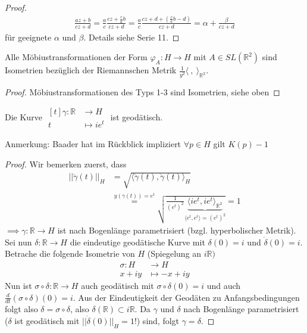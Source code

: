 \documentclass[../main.tex]{subfiles}
\begin{document}
\begin{proof}
    \begin{align*}
        \frac{az +b}{cz+d} =\frac{a}{c} \frac{cz+\frac{c}{a}b}{cz +d}=\frac{a}{c}\frac{cz+d+(\frac{c}{a}b-d)}{cz+d}
        = \alpha + \frac{\beta}{cz+d}
    \end{align*} für geeignete $\alpha$ und $\beta$.
    Details siehe Serie 11.
\end{proof}
\begin{corollary}
    Alle Möbiustransformationen der Form $\varphi _A : H \to H$ mit $A \in SL(\mathbb{R}^2)$
    sind Isometrien bezüglich der Riemannschen Metrik $\frac{1}{y^2}\langle \ , \ \rangle _{\mathbb{R}^2}$.
\end{corollary}
\begin{proof}
    Möbiustransformationen des Typs 1-3 sind Isometrien, siehe oben
\end{proof}
\begin{lemma}
    Die Kurve $\begin{aligned}[t]
        \gamma : \mathbb{R} & \to H \\
        t & \mapsto i e^t
    \end{aligned}$ ist geodätisch.
\end{lemma}
Anmerkung: Baader hat im Rückblick impliziert $\forall p\in H$ gilt $K(p) -1$
\begin{proof}
    Wir bemerken zuerst, dass
    \begin{align*}
        || \dot{\gamma}(t)||_H &= \sqrt{\langle \dot{\gamma}(t), \dot{\gamma}(t)\rangle _H} \\
        &\overset{y(\gamma(t))=e^t}{=} \sqrt{\frac{1}{(e^t)^2} \underbrace{\langle i e^t, i e ^t \rangle _{\mathbb{R}^2}}_{\langle e^t, e^t \rangle = (e^t)^2}}=1
    \end{align*}
    $\implies \gamma :\mathbb{R}\to H $ ist nach Bogenlänge parametrisiert (bzgl. hyperbolischer Metrik).
    Sei nun $\delta : \mathbb{R} \to H$ die eindeutige geodätische Kurve mit
    $\delta (0) =i$ und $\dot{\delta}(0)=i$.
    Betrache die folgende Isometrie von $H$ (Spiegelung an $i \mathbb{R})$
    \begin{align*}
        \sigma : H & \to H \\
        x +iy & \mapsto -x + iy
    \end{align*}
    Nun ist $\sigma \circ \delta :\mathbb{R}\to H$ auch geodätisch mit $\sigma \circ \delta(0)=i$
    und auch $\frac{d}{dt}(\sigma \circ \delta)(0)=i$.
    Aus der Eindeutigkeit der Geodäten zu Anfangsbedingungen folgt also $\delta = \sigma \circ \delta$,
    also $\delta (\mathbb{R}) \subset i \mathbb{R}$.
    Da $\gamma$ und $\delta $ nach Bogenlänge parametrisiert ($\delta$ ist geodätisch mit $||\dot{\delta}(0)||_H =1$!) sind, folgt $\gamma = \delta$. 
\end{proof}
\end{document}
